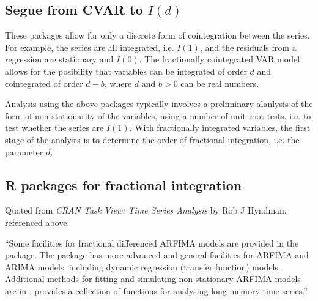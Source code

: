 \documentclass[article]{jss}
\begin{document}
\subsection{Segue from CVAR to $I(d)$}

These packages allow for only a discrete form of cointegration between the series. 
For example, the series are all integrated, i.e. $I(1)$, and the residuals from a regression are stationary and $I(0)$. 
The fractionally cointegrated VAR model allows for the posibility that variables can be integrated of order $d$ and cointegrated of order $d - b$, where $d$ and $b>0$ can be real numbers. 


Analysis using the above packages typically involves a preliminary alanlysis of the form of non-stationarity of the variables, using a number of unit root tests, i.e. to test whether the series are $I(1)$. 
With fractionally integrated variables, the first stage of the analysis is to determine the order of fractional integration, i.e. the parameter $d$. 

\subsection{R packages for fractional integration}

Quoted from \emph{CRAN Task View: Time Series Analysis} by Rob J Hyndman, referenced above:

``Some facilities for fractional differenced ARFIMA models are provided in the  package. The  package has more advanced and general facilities for ARFIMA and ARIMA models, including dynamic regression (transfer function) models. Additional methods for fitting and simulating non-stationary ARFIMA models are in .  provides a collection of functions for analysing long memory time series.''
\end{document}
